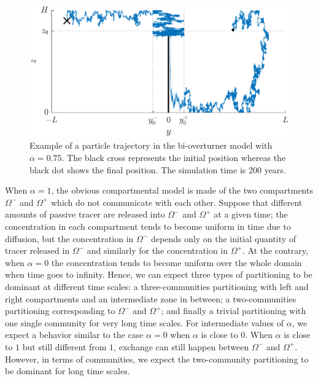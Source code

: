 \begin{figure}[!htp]
	\centering
	\includegraphics[width=\textwidth]{fig/problem2box/traj_with_transfer2.eps}
	\caption{Example of a particle trajectory in the bi-overturner model with $\alpha = 0.75$. The black cross represents the initial position whereas the black dot shows the final position. The simulation time is 200 years.}
	\label{fig:withtransfer}
\end{figure}
When $\alpha = 1$, the obvious compartmental model is made of the two compartments $\Omega^-$ and $\Omega^+$ which do not communicate with each other. Suppose that different amounts of passive tracer are released into $\Omega^-$ and $\Omega^+$ at a given time; the concentration in each compartment tends to become uniform in time due to diffusion, but the concentration in $\Omega^-$ depends only on the initial quantity of tracer released in $\Omega^-$ and similarly for the concentration in $\Omega^+$. At the contrary, when $\alpha = 0$ the concentration tends to become uniform over the whole domain when time goes to infinity. Hence, we can expect three types of partitioning to be dominant at different time scales: a three-communities partitioning with left and right compartments and an intermediate zone in between; a two-communities partitioning corresponding to $\Omega^-$ and $\Omega^+$; and finally a trivial partitioning with one single community for very long time scales. For intermediate values of $\alpha$, we expect a behavior similar to the case $\alpha = 0$ when $\alpha$ is close to $0$. When $\alpha$ is close to $1$ but still different from $1$, exchange can still happen between $\Omega^-$ and $\Omega^+$. However, in terms of communities, we expect the two-community partitioning to be dominant for long time scales.  

